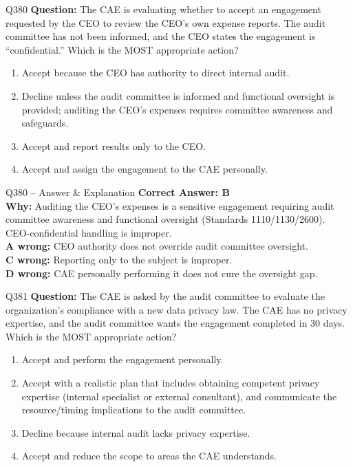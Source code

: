\documentclass[aspectratio=169,10pt]{beamer}
\begin{document}
	\begin{frame}[t]{Q380}
		\small
		\textbf{Question:} The CAE is evaluating whether to accept an engagement requested by the CEO to review the CEO's own expense reports. The audit committee has not been informed, and the CEO states the engagement is ``confidential.'' Which is the MOST appropriate action?
		\begin{enumerate}[label=\Alph*.,itemsep=1pt,topsep=2pt]
			\item Accept because the CEO has authority to direct internal audit.
			\item Decline unless the audit committee is informed and functional oversight is provided; auditing the CEO's expenses requires committee awareness and safeguards.
			\item Accept and report results only to the CEO.
			\item Accept and assign the engagement to the CAE personally.
		\end{enumerate}
	\end{frame}
	
	\begin{frame}[t]{Q380 -- Answer \& Explanation}
		\small
		\textbf{Correct Answer: B} \\[4pt]
		\textbf{Why:} Auditing the CEO's expenses is a sensitive engagement requiring audit committee awareness and functional oversight (Standards 1110/1130/2600). CEO-confidential handling is improper. \\[4pt]
		\textbf{A wrong:} CEO authority does not override audit committee oversight. \\[2pt]
		\textbf{C wrong:} Reporting only to the subject is improper. \\[2pt]
		\textbf{D wrong:} CAE personally performing it does not cure the oversight gap.
	\end{frame}
	
	\begin{frame}[t]{Q381}
		\small
		\textbf{Question:} The CAE is asked by the audit committee to evaluate the organization's compliance with a new data privacy law. The CAE has no privacy expertise, and the audit committee wants the engagement completed in 30 days. Which is the MOST appropriate action?
		\begin{enumerate}[label=\Alph*.,itemsep=1pt,topsep=2pt]
			\item Accept and perform the engagement personally.
			\item Accept with a realistic plan that includes obtaining competent privacy expertise (internal specialist or external consultant), and communicate the resource/timing implications to the audit committee.
			\item Decline because internal audit lacks privacy expertise.
			\item Accept and reduce the scope to areas the CAE understands.
		\end{enumerate}
	\end{frame}
	
\end{document}
